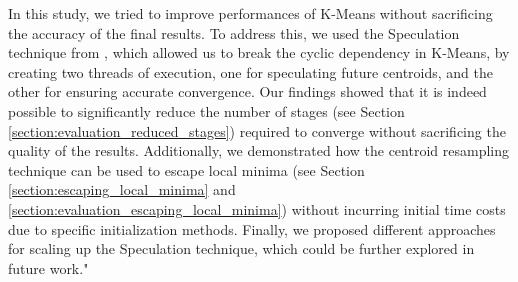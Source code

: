 In this study, we tried to improve performances of K-Means without sacrificing the accuracy of the final results. To address this, we used the Speculation technique from \cite{Sioulas:282304}, which allowed us to break the cyclic dependency in K-Means, by creating two threads of execution, one for speculating future centroids, and the other for ensuring accurate convergence. Our findings showed that it is indeed possible to significantly reduce the number of stages (see Section \ref{section:evaluation_reduced_stages}) required to converge without sacrificing the quality of the results. Additionally, we demonstrated how the centroid resampling technique can be used to escape local minima (see Section \ref{section:escaping_local_minima} and \ref{section:evaluation_escaping_local_minima}) without incurring initial time costs due to specific initialization methods. Finally, we proposed different approaches for scaling up the Speculation technique, which could be further explored in future work."